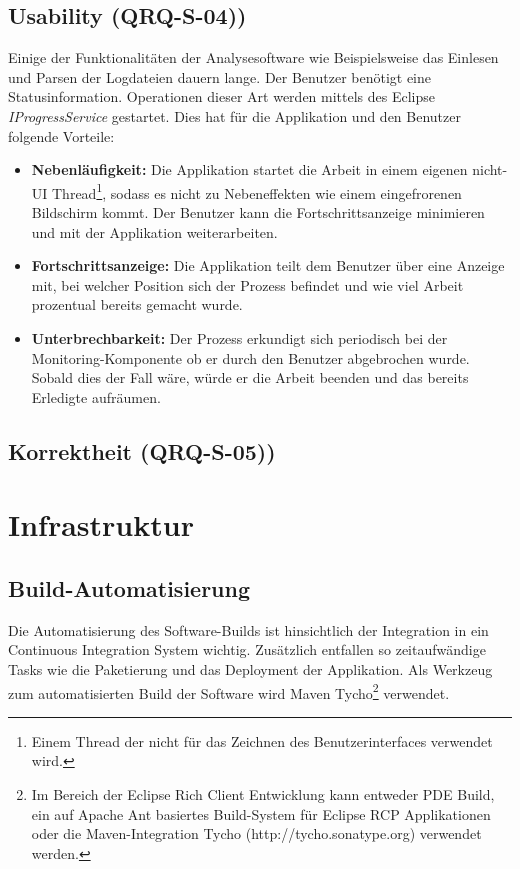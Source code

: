 \subsection{Usability (QRQ-S-04))}
Einige der Funktionalitäten der Analysesoftware wie Beispielsweise das Einlesen und Parsen der Logdateien dauern lange. Der Benutzer benötigt eine Statusinformation. Operationen dieser Art werden mittels des Eclipse \textit{IProgressService} gestartet. Dies hat für die Applikation und den Benutzer folgende Vorteile:
\begin{itemize}
	\item \textbf{Nebenläufigkeit:} Die Applikation startet die Arbeit in einem eigenen nicht-UI Thread\footnote{Einem Thread der nicht für das Zeichnen des Benutzerinterfaces verwendet wird.}, sodass es nicht zu Nebeneffekten wie einem eingefrorenen Bildschirm kommt. Der Benutzer kann die Fortschrittsanzeige minimieren und mit der Applikation weiterarbeiten.
	\item \textbf{Fortschrittsanzeige: } Die Applikation teilt dem Benutzer über eine Anzeige mit, bei welcher Position sich der Prozess befindet und wie viel Arbeit prozentual bereits gemacht wurde.
	\item \textbf{Unterbrechbarkeit: } Der Prozess erkundigt sich periodisch bei der Monitoring-Komponente ob er durch den Benutzer abgebrochen wurde. Sobald dies der Fall wäre, würde er die Arbeit beenden und das bereits Erledigte aufräumen.
\end{itemize}


\subsection{Korrektheit (QRQ-S-05))}



\section{Infrastruktur}
\subsection{Build-Automatisierung}
Die Automatisierung des Software-Builds ist hinsichtlich der Integration in ein Continuous Integration System wichtig. Zusätzlich entfallen so zeitaufwändige Tasks wie die Paketierung und das Deployment der Applikation.
Als Werkzeug zum automatisierten Build der Software wird Maven Tycho\footnote{Im Bereich der Eclipse Rich Client Entwicklung kann entweder PDE Build, ein auf Apache Ant basiertes Build-System für Eclipse RCP Applikationen\cite{vogelZapfPdeBuild} oder die Maven-Integration Tycho (http://tycho.sonatype.org) verwendet werden.} verwendet.


